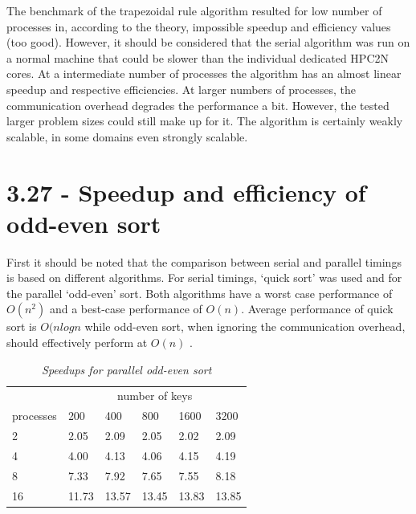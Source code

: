 \documentclass[a4paper,11pt,twoside]{article}
\begin{document}
The benchmark of the trapezoidal rule algorithm resulted for low number of processes in, according to the theory, impossible speedup and efficiency values (too good). However, it should be considered that the serial algorithm was run on a normal machine that could be slower than the individual dedicated HPC2N cores. At a intermediate number of processes the algorithm has an almost linear speedup and respective efficiencies. At larger numbers of processes, the communication overhead degrades the performance a bit. However, the tested larger problem sizes could still make up for it. The algorithm is certainly weakly scalable, in some domains even strongly scalable.  

\section{3.27 - Speedup and efficiency of odd-even sort}
First it should be noted that the comparison between serial and parallel timings is based on different algorithms. For serial timings, `quick sort' was used and for the parallel `odd-even' sort. Both algorithms have a worst case performance of $O(n^{2})$ and a best-case performance of $O(n)$. Average performance of quick sort is $O(n log n$ while odd-even sort, when ignoring the communication overhead, should effectively perform at $O(n)$ \cite{hanke_kth}. 

\begin{table}[]
\centering
\caption{\textit{Speedups for parallel odd-even sort}}
\label{tab:speedups}
\begin{tabular}{llllll}
\multicolumn{1}{l|}{}          & \multicolumn{5}{c}{number of keys}                                                                                 \\ \cline{2-6} 
\multicolumn{1}{l|}{processes} & \multicolumn{1}{l|}{200} & \multicolumn{1}{l|}{400} & \multicolumn{1}{l|}{800} & \multicolumn{1}{l|}{1600} & 3200  \\ \hline
2                              & 2.05                     & 2.09                     & 2.05                     & 2.02                      & 2.09  \\
4                              & 4.00                     & 4.13                     & 4.06                     & 4.15                      & 4.19  \\
8                              & 7.33                     & 7.92                     & 7.65                     & 7.55                      & 8.18  \\
16                             & 11.73                    & 13.57                    & 13.45                    & 13.83                     & 13.85
\end{tabular}
\end{table}
\end{document}
